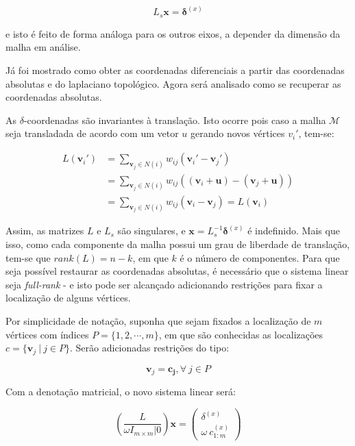 \begin{equation}
L_s \mathbf{x} = \mathbf{\delta}^{(x)}
\end{equation}

\noindent e isto é feito de forma análoga para os outros eixos, a depender da dimensão da malha em análise.

Já foi mostrado como obter as coordenadas diferenciais a partir das coordenadas absolutas e do laplaciano topológico. Agora será analisado como se recuperar as coordenadas absolutas.

As $\delta$-coordenadas são invariantes à translação. Isto ocorre pois caso a malha $\mathcal{M}$ seja transladada de acordo com um vetor $u$ gerando novos vértices $v_i'$, tem-se:

\begin{align*}
L(\mathbf{v}_i') &= \sum_{\mathbf{v}_j \in N(i)} w_{ij} (\mathbf{v}_i' - \mathbf{v}_j')\\ 
 &= \sum_{\mathbf{v}_j \in N(i)} w_{ij} ((\mathbf{v}_i + \mathbf{u})  - (\mathbf{v}_j + \mathbf{u}))\\ 
 &= \sum_{\mathbf{v}_j \in N(i)} w_{ij} (\mathbf{v}_i - \mathbf{v}_j) = L(\mathbf{v}_i)
\end{align*}

Assim, as matrizes $L$ e $L_s$ são singulares, e $\mathbf{x} = L_s^{-1} \mathbf{\delta}^{(x)}$ é indefinido. Mais que isso, como cada componente da malha possui um grau de liberdade de translação, tem-se que $rank(L) = n - k$, em que $k$ é o número de componentes. Para que seja possível restaurar as coordenadas absolutas, é necessário que o sistema linear seja \textit{full-rank} - e isto pode ser alcançado adicionando restrições para fixar a localização de alguns vértices.

Por simplicidade de notação, suponha que sejam fixados a localização de $m$ vértices com índices $P = \{1, 2, \cdots, m\}$, em que são conhecidas as localizações $c = \{\mathbf{v}_j\ |\ j \in P\}$. Serão adicionadas restrições do tipo:

$$\mathbf{v}_j = \mathbf{c_j}, \forall\ j \in P$$

Com a denotação matricial, o novo sistema linear será:

\begin{equation}\label{eq:sisrecover}
\left( \frac{L}{\omega I_{m \times m} | 0} \right) \mathbf{x} = \begin{pmatrix}
\delta^{(x)}\\
\omega\ c_{1:m}^{(x)}
\end{pmatrix}
\end{equation}

